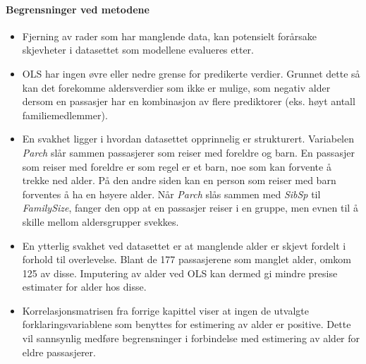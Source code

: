 \paragraph{Begrensninger ved metodene}
\begin{itemize}
    \item Fjerning av rader som har manglende data, kan potensielt forårsake skjevheter i datasettet som modellene evalueres etter.
    \item OLS har ingen øvre eller nedre grense for predikerte verdier. Grunnet dette så kan det forekomme aldersverdier som ikke er mulige, som negativ alder dersom en passasjer har en kombinasjon av flere prediktorer (eks. høyt antall familiemedlemmer).
    \item En svakhet ligger i hvordan datasettet opprinnelig er strukturert. Variabelen \textit{Parch} slår sammen passasjerer som reiser med foreldre og barn. En passasjer som reiser med foreldre er som regel er et barn, noe som kan forvente å trekke ned alder. På den andre siden kan en person som reiser med barn forventes å ha en høyere alder. Når \textit{Parch} slås sammen med \textit{SibSp} til \textit{FamilySize}, fanger den opp at en passasjer reiser i en gruppe, men evnen til å skille mellom aldersgrupper svekkes.
    \item En ytterlig svakhet ved datasettet er at manglende alder er skjevt fordelt i forhold til overlevelse. Blant de 177 passasjerene som manglet alder, omkom 125 av disse. Imputering av alder ved OLS kan dermed gi mindre presise estimater for alder hos disse.
    \item Korrelasjonsmatrisen fra forrige kapittel viser at ingen de utvalgte forklaringsvariablene som benyttes for estimering av alder er positive. Dette vil sannsynlig medføre begrensninger i forbindelse med estimering av alder for eldre passasjerer.
\end{itemize}
